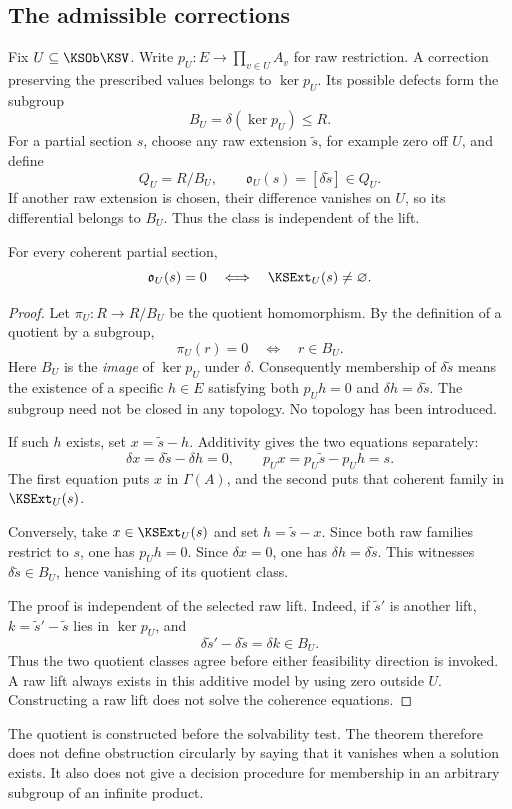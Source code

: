 \subsection{The admissible corrections}
Fix \(U\subseteq\KSOb\KSV\). Write \(p_U:E\to\prod_{v\in U}A_v\) for raw restriction. A correction preserving the prescribed values belongs to \(\ker p_U\). Its possible defects form the subgroup
\[
 B_U=\delta(\ker p_U)\le R.
\]
For a partial section \(s\), choose any raw extension \(\widetilde s\), for example zero off \(U\), and define
\begin{equation}\label{KS:eq:obstruction}
 Q_U=R/B_U,\qquad
 \mathfrak o_U(s)=[\delta\widetilde s]\in Q_U.
\end{equation}
If another raw extension is chosen, their difference vanishes on \(U\), so its differential belongs to \(B_U\). Thus the class is independent of the lift.

\begin{KStheorem}\label{KS:KS09}
For every coherent partial section,
\[
 \mathfrak o_U(s)=0\quad\Longleftrightarrow\quad\KSExt_U(s)\ne\varnothing.
\]
\end{KStheorem}
\begin{proof}
Let $\pi_U:R\to R/B_U$ be the quotient homomorphism. By the definition of a quotient by a subgroup,
\[
 \pi_U(r)=0\quad\Longleftrightarrow\quad r\in B_U.
\]
Here $B_U$ is the \emph{image} of $\ker p_U$ under $\delta$. Consequently membership of $\delta\widetilde s$ means the existence of a specific $h\in E$ satisfying both $p_Uh=0$ and $\delta h=\delta\widetilde s$. The subgroup need not be closed in any topology. No topology has been introduced.

If such $h$ exists, set $x=\widetilde s-h$. Additivity gives the two equations separately:
\[
 \delta x=\delta\widetilde s-\delta h=0,
 \qquad p_Ux=p_U\widetilde s-p_Uh=s.
\]
The first equation puts $x$ in $\Gamma(A)$, and the second puts that coherent family in $\KSExt_U(s)$.

Conversely, take $x\in\KSExt_U(s)$ and set $h=\widetilde s-x$. Since both raw families restrict to $s$, one has $p_Uh=0$. Since $\delta x=0$, one has $\delta h=\delta\widetilde s$. This witnesses $\delta\widetilde s\in B_U$, hence vanishing of its quotient class.

The proof is independent of the selected raw lift. Indeed, if $\widetilde s'$ is another lift, $k=\widetilde s'-\widetilde s$ lies in $\ker p_U$, and
\[
 \delta\widetilde s'-\delta\widetilde s=\delta k\in B_U.
\]
Thus the two quotient classes agree before either feasibility direction is invoked. A raw lift always exists in this additive model by using zero outside $U$. Constructing a raw lift does not solve the coherence equations.
\end{proof}
The quotient is constructed before the solvability test. The theorem therefore does not define obstruction circularly by saying that it vanishes when a solution exists. It also does not give a decision procedure for membership in an arbitrary subgroup of an infinite product.

